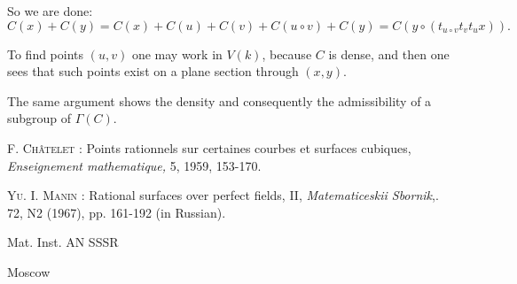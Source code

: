 So we are done:
$$
C(x)+C(y)=C(x)+C(u)+C(v)+C(u\circ v)+C(y)=C(y\circ (t_{u\circ v}t_{v}t_{u}x)).
$$

To find points $(u,v)$ one may work in $V(k)$, because $C$ is dense, and then one sees that such points exist on a plane section through $(x,y)$.

The same argument shows the density and consequently the admissibility of a subgroup of $\Gamma(C)$.

\begin{thebibliography}{99}
 \textsc{F. Ch\^atelet :} Points rationnels sur certaines courbes et surfaces cubiques, {\em Enseignement mathematique,} 5, 1959, 153-170.

 \textsc{Yu. I. Manin :} Rational surfaces over perfect fields, II, {\em Matematiceskii Sbornik},. 72, N2 (1967), pp. 161-192 (in Russian).
\end{thebibliography}

\bigskip
\noindent
Mat. Inst. AN SSSR

\noindent
Moscow



